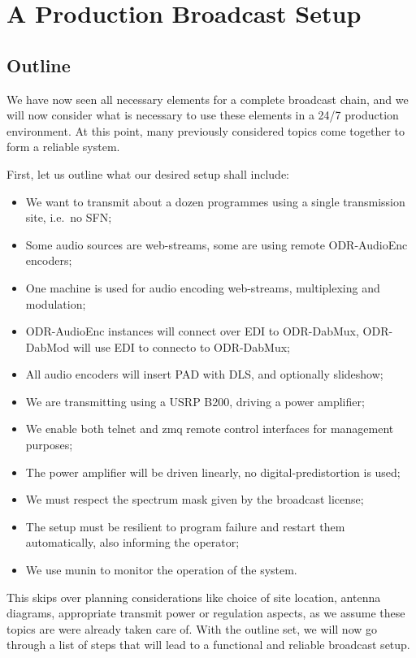\section{A Production Broadcast Setup}
\subsection{Outline}
We have now seen all necessary elements for a complete broadcast chain, and we
will now consider what is necessary to use these elements in a 24/7 production
environment. At this point, many previously considered topics come together to
form a reliable system.

First, let us outline what our desired setup shall include:

\begin{itemize}
    \item We want to transmit about a dozen programmes using a single
        transmission site, i.e.~no SFN;
    \item Some audio sources are web-streams, some are using remote ODR-AudioEnc
        encoders;
    \item One machine is used for audio encoding web-streams, multiplexing and
        modulation;
    \item ODR-AudioEnc instances will connect over EDI to ODR-DabMux,
        ODR-DabMod will use EDI to connecto to ODR-DabMux;
    \item All audio encoders will insert PAD with DLS, and optionally slideshow;
    \item We are transmitting using a USRP B200, driving a power amplifier;
    \item We enable both telnet and zmq remote control interfaces for management
        purposes;
    \item The power amplifier will be driven linearly, no digital-predistortion
        is used;
    \item We must respect the spectrum mask given by the broadcast license;
    \item The setup must be resilient to program failure and restart them
        automatically, also informing the operator;
    \item We use munin to monitor the operation of the system.
\end{itemize}

This skips over planning considerations like choice of site location, antenna
diagrams, appropriate transmit power or regulation aspects, as we assume these
topics are were already taken care of.
With the outline set, we will now go through a list of steps that will lead to a
functional and reliable broadcast setup.



